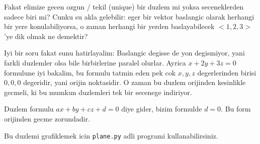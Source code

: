 \documentclass[12pt,fleqn]{article}\usepackage{../common}
\begin{document}
Fakat elimize gecen ozgun / tekil (unique) bir duzlem mi yoksa
seceneklerden sadece biri mi? Cunku su akla gelebilir: eger bir vektor
baslangic olarak herhangi bir yere konulabiliyorsa, o zaman herhangi bir
yerden baslayabilecek $<1,2,3>$'ye dik olmak ne demektir? 

Iyi bir soru fakat sunu hatirlayalim: Baslangic degisse de yon degismiyor,
yani farkli duzlemler olsa bile birbirlerine paralel olurlar. Ayrica $x +
2y + 3z = 0$ 
formulune iyi bakalim, bu formulu tatmin eden pek cok $x,y,z$
degerlerinden birisi $0,0,0$ degeridir, yani orijin noktasidir. O zaman bu duzlem
orijinden kesinlikle gecmeli, ki bu mumkun duzlemleri tek bir secenege
indiriyor. 

Duzlem formulu $ax + by + cz + d= 0$ diye gider, bizim formulde $d=0$. Bu
form orijinden gecme zorundadir.

Bu duzlemi grafiklemek icin \verb!plane.py! adli programi kullanabilirsiniz.
\end{document}
